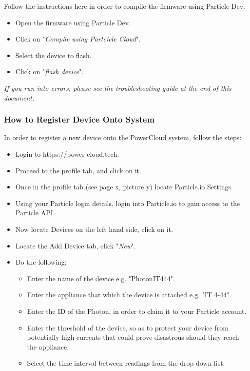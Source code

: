 \documentclass[a4paper,10pt]{article}
\begin{document}
	
			Follow the instructions here in order to compile the firmware using Particle 
			Dev.
			\\
			\begin{itemize}
				\item Open the firmware using Particle Dev.
				\item Click on "\textit{Compile using Partcicle Cloud}".
				\item Select the device to flash.
				\item Click on "\textit{flash device}".
			\end{itemize}
			
			\textit{If you run into errors, please see the troubleshooting guide at the end of this document.}
		\subsubsection{How to Register Device Onto System}
			In order to register a new device onto the PowerCloud system, follow the steps:
			
			\begin{itemize}
				\item Login to https://power-cloud.tech.
				\item Proceed to the profile tab, and click on it.
				\item Once in the profile tab (see page x, picture y) locate Particle.io Settings.
				\item Using your Particle login details, login into Particle.io to gain access to the Particle API.
				\item Now locate Devices on the left hand side, click on it.
				\item Locate the Add Device tab, click "\textit{New}".
				\item Do the following:
				\begin{itemize}
					\item Enter the name of the device e.g. "PhotonIT444".
					\item Enter the appliance that which the device is attached e.g. "IT 4-44".
					\item Enter the ID of the Photon, in order to claim it to your Particle account.
					\item Enter the threshold of the device, so as to protect your device from potentially high currents that could prove disastrous should they reach the appliance.
					\item Select the time interval between readings from the drop down list.
				\end{itemize}
			\end{itemize}
\end{document}
